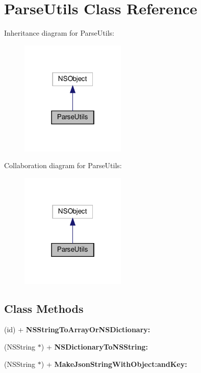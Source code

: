 \hypertarget{interfaceParseUtils}{}\section{Parse\+Utils Class Reference}
\label{interfaceParseUtils}


Inheritance diagram for Parse\+Utils\+:
\nopagebreak
\begin{figure}[H]
\begin{center}
\leavevmode
\includegraphics[width=142pt]{interfaceParseUtils__inherit__graph}
\end{center}
\end{figure}


Collaboration diagram for Parse\+Utils\+:
\nopagebreak
\begin{figure}[H]
\begin{center}
\leavevmode
\includegraphics[width=142pt]{interfaceParseUtils__coll__graph}
\end{center}
\end{figure}
\subsection*{Class Methods}
\begin{DoxyCompactItemize}
\item 
\mbox{\label{interfaceParseUtils_ae318f7b0e2e286ca08eb202a13f15094}} 
(id) + {\bfseries N\+S\+String\+To\+Array\+Or\+N\+S\+Dictionary\+:}
\item 
\mbox{\label{interfaceParseUtils_ad1d6ac516b8d086274a0714c03e37bb4}} 
(N\+S\+String $\ast$) + {\bfseries N\+S\+Dictionary\+To\+N\+S\+String\+:}
\item 
\mbox{\label{interfaceParseUtils_a643e453f4633978d9f625914f78c50a3}} 
(N\+S\+String $\ast$) + {\bfseries Make\+Json\+String\+With\+Object\+:and\+Key\+:}
\end{DoxyCompactItemize}


